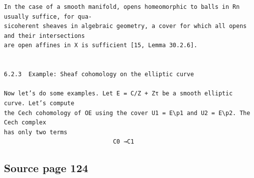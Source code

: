 \begin{Verbatim}[fontsize=\small]
In the case of a smooth manifold, opens homeomorphic to balls in Rn usually suffice, for qua-
sicoherent sheaves in algebraic geometry, a cover for which all opens and their intersections
are open affines in X is sufficient [15, Lemma 30.2.6].


6.2.3  Example: Sheaf cohomology on the elliptic curve

Now let’s do some examples. Let E = C/Z + Zτ be a smooth elliptic curve. Let’s compute
the Cech cohomology of OE using the cover U1 = E\p1 and U2 = E\p2. The Cech complex
has only two terms
                               C0 →C1
\end{Verbatim}

\subsection*{Source page 124}
